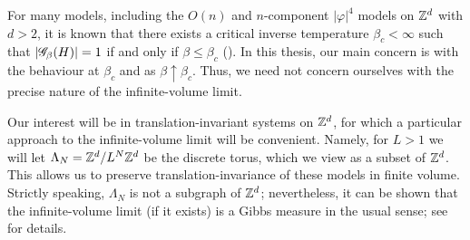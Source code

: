 For many models, including the $O(n)$ and $n$-component $|\varphi|^4$ models on ${ {{\mathbb Z}}^d }$ with $d > 2$, it is known that there exists a critical inverse temperature $\beta_c < \infty$ such that
$|\mathscr{G}_\beta(H)| = 1$ if and only if $\beta \le \beta_c$ (\REF). In this thesis, our main concern is with the behaviour at $\beta_c$ and as
$\beta \uparrow \beta_c$. Thus, we need not concern ourselves with the precise nature of the infinite-volume limit.

\begin{rk}
Our interest will be in translation-invariant systems on ${ {{\mathbb Z}}^d }$, for which a particular approach to the infinite-volume limit will be convenient. Namely, for $L > 1$ we will let $\Lambda_N = { {{\mathbb Z}}^d }/L^N{ {{\mathbb Z}}^d }$ be the discrete torus, which we view as a subset of ${ {{\mathbb Z}}^d }$. This allows us to preserve
translation-invariance of these models in finite volume. Strictly speaking, $\Lambda_N$ is not a subgraph of ${ {{\mathbb Z}}^d }$; nevertheless, it can be shown that the infinite-volume limit (if it exists) is a Gibbs measure in the usual sense; see \cite[Example 4.20]{Georgii11} for details.
\end{rk}



